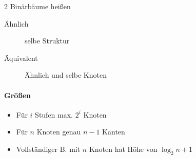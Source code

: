 $2$ Binärbäume hei\ss en

\begin{description}
  \item[Ähnlich] selbe Struktur

  \item[Äquivalent] Ähnlich und selbe Knoten
\end{description}

\paragraph{Grö\ss en}

\begin{itemize}
  \item Für $i$ Stufen max. $2^i$ Knoten
  \item Für $n$ Knoten genau $n - 1$ Kanten
  \item Vollständiger B. mit $n$ Knoten hat Höhe von $\log_2 n + 1$
\end{itemize}